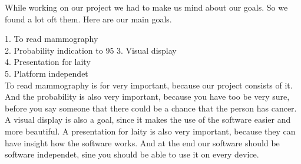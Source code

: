 While working on our project we had to make us mind about our goals. So we found a lot oft them.  Here are our main goals.

1.	To read mammography\\
2.	Probability indication to 95%
3.	Visual display\\
4.	Presentation for laity\\
5.	Platform independet\\

To read mammography is for very important, because our project consists of it. And the probability is also very important, because you have too be very sure, before you say someone that there could be a chance that the person has cancer. A visual display is also a goal, since it makes the use of the software easier and more beautiful. A presentation for laity is also very important, because they can have insight how the software works. And at the end our software should be software independet, sine you should be able to use it on every device.
